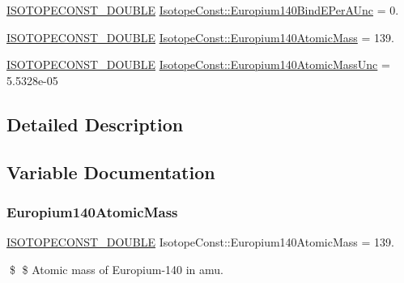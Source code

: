 \begin{DoxyCompactItemize}
\mbox{\hyperlink{group___isotope_const-_macros_ga8f45a7272ce02c0b4c65c44636ed719a}{I\+S\+O\+T\+O\+P\+E\+C\+O\+N\+S\+T\+\_\+\+D\+O\+U\+B\+LE}} \mbox{\hyperlink{group___isotope_const-_europium-_eu140_gad02acd0f16fe9a5d23264e40459c41dc}{Isotope\+Const\+::\+Europium140\+Bind\+E\+Per\+A\+Unc}} = 0.
\item 
\mbox{\hyperlink{group___isotope_const-_macros_ga8f45a7272ce02c0b4c65c44636ed719a}{I\+S\+O\+T\+O\+P\+E\+C\+O\+N\+S\+T\+\_\+\+D\+O\+U\+B\+LE}} \mbox{\hyperlink{group___isotope_const-_europium-_eu140_ga06f9cde419e06df34e6f2b7f4cbc939b}{Isotope\+Const\+::\+Europium140\+Atomic\+Mass}} = 139.
\item 
\mbox{\hyperlink{group___isotope_const-_macros_ga8f45a7272ce02c0b4c65c44636ed719a}{I\+S\+O\+T\+O\+P\+E\+C\+O\+N\+S\+T\+\_\+\+D\+O\+U\+B\+LE}} \mbox{\hyperlink{group___isotope_const-_europium-_eu140_ga3841dd29b021a200f549fac8f107c117}{Isotope\+Const\+::\+Europium140\+Atomic\+Mass\+Unc}} = 5.\+5328e-\/05
\end{DoxyCompactItemize}


\subsection{Detailed Description}


\subsection{Variable Documentation}
\mbox{\label{group___isotope_const-_europium-_eu140_ga06f9cde419e06df34e6f2b7f4cbc939b}} 
\subsubsection{\texorpdfstring{Europium140\+Atomic\+Mass}{Europium140AtomicMass}}
{\footnotesize\ttfamily \mbox{\hyperlink{group___isotope_const-_macros_ga8f45a7272ce02c0b4c65c44636ed719a}{I\+S\+O\+T\+O\+P\+E\+C\+O\+N\+S\+T\+\_\+\+D\+O\+U\+B\+LE}} Isotope\+Const\+::\+Europium140\+Atomic\+Mass = 139.}

\$ \$ Atomic mass of Europium-\/140 in amu. \mbox{\label{group___isotope_const-_europium-_eu140_ga3841dd29b021a200f549fac8f107c117}} 
